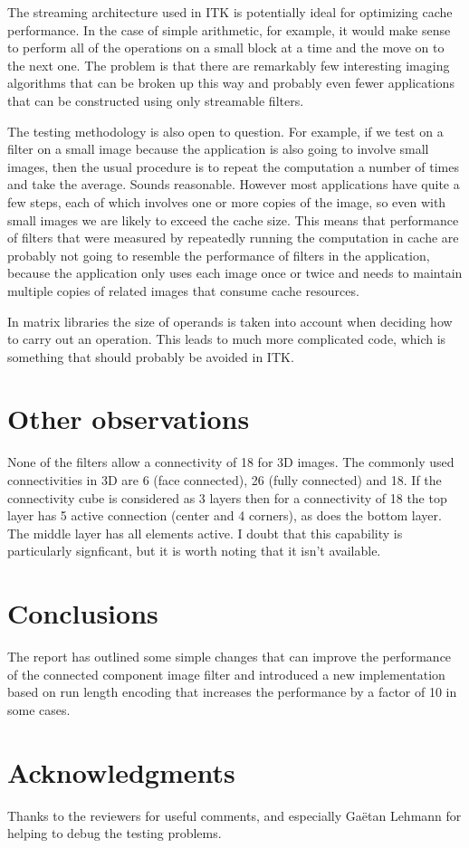 \documentclass{InsightArticle}
\begin{document}
The streaming architecture used in ITK is potentially ideal for
optimizing cache performance. In the case of simple arithmetic, for
example, it would make sense to perform all of the operations on a
small block at a time and the move on to the next one. The problem is
that there are remarkably few interesting imaging algorithms that can
be broken up this way and probably even fewer applications that can be
constructed using only streamable filters.

The testing methodology is also open to question. For example, if we
test on a filter on a small image because the application is also
going to involve small images, then the usual procedure is to repeat
the computation a number of times and take the average. Sounds
reasonable. However most applications have quite a few steps, each of
which involves one or more copies of the image, so even with small
images we are likely to exceed the cache size. This means that
performance of filters that were measured by repeatedly running the
computation in cache are probably not going to resemble the
performance of filters in the application, because the application
only uses each image once or twice and needs to maintain multiple
copies of related images that consume cache resources.

In matrix libraries the size of operands is taken into account when
deciding how to carry out an operation. This leads to much more
complicated code, which is something that should probably be avoided
in ITK.

\section{Other observations}
None of the filters allow a connectivity of 18 for 3D images. The
commonly used connectivities in 3D are 6 (face connected), 26 (fully
connected) and 18. If the connectivity cube is considered as 3 layers
then for a connectivity of 18 the top layer has 5 active connection
(center and 4 corners), as does the bottom layer. The middle layer has
all elements active. I doubt that this capability is particularly
signficant, but it is worth noting that it isn't available.

\section{Conclusions}
The report has outlined some simple changes that can improve the
performance of the connected component image filter and introduced a
new implementation based on run length encoding that increases the
performance by a factor of 10 in some cases.

\section{Acknowledgments}
Thanks to the reviewers for useful comments, and especially Ga\"etan
Lehmann for helping to debug the testing problems.



%
\nocite{ITKSoftwareGuide}
\end{document}
